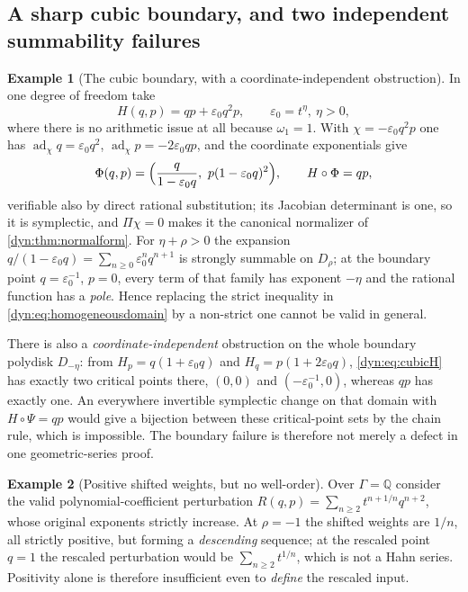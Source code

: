 \documentclass[11pt,letterpaper]{article}
\theoremstyle{definition}
\newtheorem{example}[example]{Example}
\theoremstyle{remark}
\newcommand{\Q}{\mathbb Q}
\newcommand{\ad}{\operatorname{ad}}
\newcommand{\eps}{\varepsilon}
\numberwithin{equation}{section}
\begin{document}
\subsection{A sharp cubic boundary, and two independent summability failures}

\begin{example}[The cubic boundary, with a coordinate-independent
obstruction]\label{dyn:ex:cubic}
In one degree of freedom take
\begin{equation}\label{dyn:eq:cubicH}
 H(q,p)=qp+\eps_0q^{2}p,\qquad \eps_0=t^{\eta},\ \eta>0,
\end{equation}
where there is no arithmetic issue at all because $\omega_1=1$. With
$\chi=-\eps_0q^{2}p$ one has $\ad_\chi q=\eps_0q^{2}$,
$\ad_\chi p=-2\eps_0qp$, and the coordinate exponentials give
\begin{equation}\label{dyn:eq:cubicmap}
 \Phi(q,p)=\Bigl(\frac{q}{1-\eps_0q},\ p(1-\eps_0q)^{2}\Bigr),
 \qquad H\circ\Phi=qp ,
\end{equation}
verifiable also by direct rational substitution; its Jacobian determinant
is one, so it is symplectic, and $\Pi\chi=0$ makes it the canonical
normalizer of \cref{dyn:thm:normalform}. For $\eta+\rho>0$ the expansion
$q/(1-\eps_0q)=\sum_{n\ge0}\eps_0^{n}q^{n+1}$ is strongly summable on
$D_\rho$; at the boundary point $q=\eps_0^{-1}$, $p=0$, every term of that
family has exponent $-\eta$ and the rational function has a \emph{pole}.
Hence replacing the strict inequality in
\eqref{dyn:eq:homogeneousdomain} by a non-strict one cannot be valid in
general.

There is also a \emph{coordinate-independent} obstruction on the whole
boundary polydisk $D_{-\eta}$: from $H_p=q(1+\eps_0q)$ and
$H_q=p(1+2\eps_0q)$, \eqref{dyn:eq:cubicH} has exactly two critical points
there, $(0,0)$ and $(-\eps_0^{-1},0)$, whereas $qp$ has exactly one. An
everywhere invertible symplectic change on that domain with
$H\circ\Psi=qp$ would give a bijection between these critical-point sets by
the chain rule, which is impossible. The boundary failure is therefore not
merely a defect in one geometric-series proof.
\end{example}

\begin{example}[Positive shifted weights, but no well-order]
\label{dyn:ex:badorder}
Over $\Gamma=\Q$ consider the valid polynomial-coefficient perturbation
$R(q,p)=\sum_{n\ge2}t^{n+1/n}q^{n+2}$, whose original exponents strictly
increase. At $\rho=-1$ the shifted weights are $1/n$, all strictly
positive, but forming a \emph{descending} sequence; at the rescaled point
$q=1$ the rescaled perturbation would be $\sum_{n\ge2}t^{1/n}$, which is
not a Hahn series. Positivity alone is therefore insufficient even to
\emph{define} the rescaled input.
\end{example}
\end{document}

